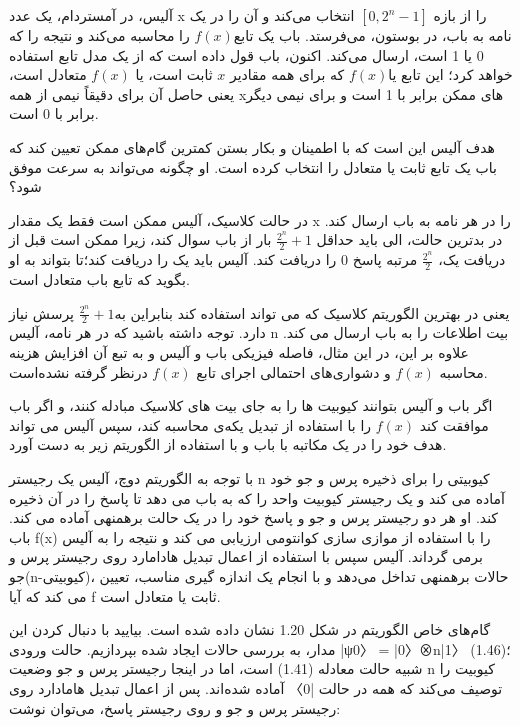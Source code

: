 \documentclass{book}
\begin{document}
آلیس، در آمستردام، یک عدد x را از بازه‌ $[0, 2^n-1]$ انتخاب می‌کند و آن را در یک نامه به باب، در بوستون، می‌فرستد. باب یک تابع$ f(x)$ را محاسبه می‌کند و نتیجه را که 0 یا 1 است، ارسال می‌کند. اکنون، باب قول داده است که از یک مدل تابع استفاده خواهد کرد؛ این تابع یا$ f(x)$ که برای همه مقادیر $x$ ثابت است، یا $f(x)$ متعادل است، یعنی‌ حاصل آن برای دقیقاً نیمی از همه xهای ممکن برابر با 1 است و برای نیمی دیگر برابر با 0 است.

هدف آلیس این است که با اطمینان و بکار بستن کمترین گام‌های ممکن تعیین کند که باب یک تابع ثابت یا متعادل را انتخاب کرده است. او چگونه می‌تواند به سرعت موفق شود؟

در حالت کلاسیک، آلیس ممکن است فقط یک مقدار x را در هر نامه به باب ارسال کند. در بدترین حالت، الی باید حداقل $\frac{2^n}{2} + 1$ بار از باب سوال کند، زیرا ممکن است قبل از دریافت یک، $\frac{2^n}{2}$ مرتبه پاسخ $0$ را دریافت کند. آلیس باید یک را دریافت کند؛‌تا بتواند به او بگوید که تابع باب متعادل است. 

یعنی در بهترین الگوریتم کلاسیک که می تواند استفاده کند بنابراین به$\frac{2^n}{2} + 1$ پرسش نیاز دارد. توجه داشته باشید که در هر نامه، آلیس n بیت اطلاعات را به باب ارسال می کند. علاوه بر این، در این مثال، فاصله فیزیکی باب و آلیس و به تبع آن افزایش هزینه محاسبه $f(x)$ و دشواری‌های احتمالی اجرای تابع $f(x)$ درنظر گرفته نشده‌است.

	اگر باب و آلیس بتوانند کیوبیت ها را به جای بیت های کلاسیک مبادله کنند، و اگر باب موافقت کند $f (x)$ را با استفاده از تبدیل یکه‌ی  محاسبه کند، سپس آلیس می تواند هدف خود را در یک مکاتبه با باب و با استفاده از الگوریتم زیر به دست آورد.
	
	با توجه به الگوریتم دوچ، آلیس یک رجیستر n کیوبیتی را برای ذخیره پرس و جو خود آماده می کند و یک رجیستر کیوبیت واحد را که به باب می دهد تا پاسخ را در آن ذخیره کند. او هر دو رجیستر پرس و جو و پاسخ خود را در یک حالت برهمنهی آماده می کند. باب f(x) را با استفاده از موازی سازی کوانتومی ارزیابی می کند و نتیجه را به آلیس برمی گرداند. آلیس سپس با استفاده از اعمال تبدیل هادامارد روی رجیستر پرس و جو(n-کیوبیتی)، حالات برهمنهی تداخل می‌دهد و با انجام یک اندازه گیری مناسب، تعیین می کند که آیا f ثابت یا متعادل است.
		
	گام‌های خاص الگوریتم در شکل 1.20 نشان داده شده است. بیایید با دنبال کردن این مدار، به بررسی حالات ایجاد شده بپردازیم.
	حالت ورودی |ψ0〉 = |0〉⊗n|1〉 (1.46)؛‌ شبیه حالت معادله (1.41) است، اما در اینجا رجیستر پرس و جو وضعیت n کیوبیت را توصیف می‌کند که همه در حالت |0〉 آماده شده‌اند. پس از اعمال تبدیل هامادارد روی رجیستر پرس و جو  و روی رجیستر پاسخ، می‌توان نوشت:
	
\end{document}
